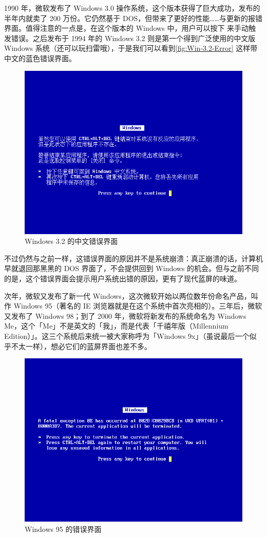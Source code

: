 1990 年，微软发布了 Windows 3.0 操作系统，这个版本获得了巨大成功，发布的半年内就卖了 200 万份。它仍然基于 DOS，但带来了更好的性能……与更新的报错界面。值得注意的一点是，在这个版本的 Windows 中，用户可以按下  来手动触发错误。之后发布于 1994 年的 Windows 3.2 则是第一个得到广泛使用的中文版 Windows 系统（还可以玩扫雷哦），于是我们可以看到\autoref{fig:Win-3.2-Error} 这样带中文的蓝色错误界面。

\begin{figure}[htb!]
  \centering
  \includegraphics[width=.62\textwidth]{assets/advanced/Win-3.2-Error.png}
  \caption{Windows 3.2 的中文错误界面}
  \label{fig:Win-3.2-Error}
\end{figure}

不过仍然与之前一样，这错误界面的原因并不是系统崩溃：真正崩溃的话，计算机早就退回那黑黑的 DOS 界面了，不会提供回到 Windows 的机会。但与之前不同的是，这个错误界面会提示用户系统出错的原因，更有了现代蓝屏的味道。

次年，微软又发布了新一代 Windows，这次微软开始以两位数年份命名产品，叫作 Windows 95（著名的 IE 浏览器就是在这个系统中首次亮相的）。三年后，微软又发布了 Windows 98；到了 2000 年，微软将新发布的系统命名为 Windows Me，这个「Me」不是英文的「我」，而是代表「千禧年版（Millennium Edition）」。这三个系统后来统一被大家称呼为「Windows 9x」（虽说最后一个似乎不太一样），想必它们的蓝屏界面也差不多。

\begin{figure}[htb!]
  \centering
  \includegraphics[width=.62\textwidth]{assets/advanced/Win-95-Error.png}
  \caption{Windows 95 的错误界面}
  \label{fig:Win-95-Error}
\end{figure}

